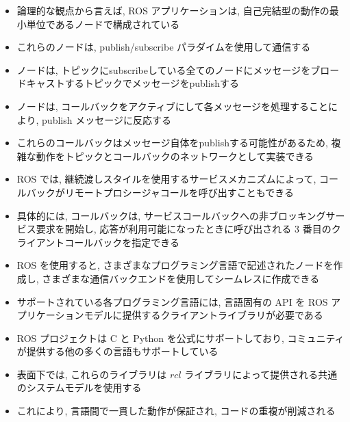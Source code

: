 \begin{frame}{}
    \begin{itemize}
        \item 論理的な観点から言えば, ROS アプリケーションは, 自己完結型の動作の最小単位であるノードで構成されている
        \item これらのノードは, publish/subscribe パラダイムを使用して通信する
        \item ノードは, トピックにsubscribeしている全てのノードにメッセージをブロードキャストするトピックでメッセージをpublishする
        \item ノードは, コールバックをアクティブにして各メッセージを処理することにより, publish メッセージに反応する
        \item これらのコールバックはメッセージ自体をpublishする可能性があるため, 複雑な動作をトピックとコールバックのネットワークとして実装できる
    \end{itemize}
\end{frame}

\begin{frame}{}
    \begin{itemize}
        \item  ROS では, 継続渡しスタイルを使用するサービスメカニズムによって, コールバックがリモートプロシージャコールを呼び出すこともできる
        \item 具体的には, コールバックは, サービスコールバックへの非ブロッキングサービス要求を開始し, 応答が利用可能になったときに呼び出される 3 番目のクライアントコールバックを指定できる
        \item ROS を使用すると, さまざまなプログラミング言語で記述されたノードを作成し, さまざまな通信バックエンドを使用してシームレスに作成できる
    \end{itemize}
\end{frame}

\begin{frame}{}
\end{frame}

\begin{frame}{}
    \begin{itemize}
        \item サポートされている各プログラミング言語には, 言語固有の API を ROS アプリケーションモデルに提供するクライアントライブラリが必要である
        \item ROS プロジェクトは C と Python を公式にサポートしており, コミュニティが提供する他の多くの言語もサポートしている
        \item 表面下では, これらのライブラリは $r c l$ ライブラリによって提供される共通のシステムモデルを使用する
        \item これにより, 言語間で一貫した動作が保証され, コードの重複が削減される
    \end{itemize}
\end{frame}

